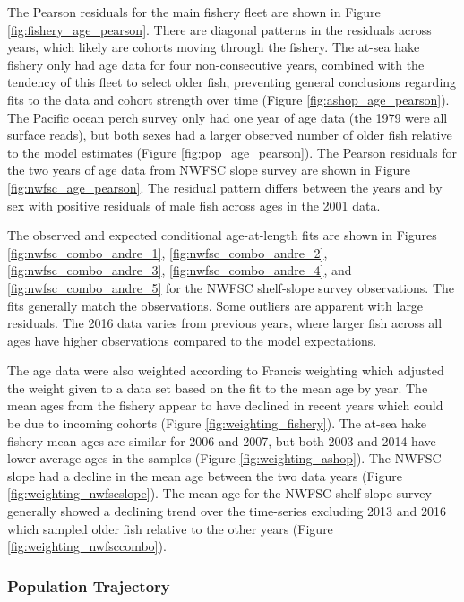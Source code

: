 \documentclass[12pt,]{article}
\begin{document}
The Pearson residuals for the main fishery fleet are shown in Figure
\ref{fig:fishery_age_pearson}. There are diagonal patterns in the
residuals across years, which likely are cohorts moving through the
fishery. The at-sea hake fishery only had age data for four
non-consecutive years, combined with the tendency of this fleet to
select older fish, preventing general conclusions regarding fits to the
data and cohort strength over time (Figure \ref{fig:ashop_age_pearson}).
The Pacific ocean perch survey only had one year of age data (the 1979
were all surface reads), but both sexes had a larger observed number of
older fish relative to the model estimates (Figure
\ref{fig:pop_age_pearson}). The Pearson residuals for the two years of
age data from NWFSC slope survey are shown in Figure
\ref{fig:nwfsc_age_pearson}. The residual pattern differs between the
years and by sex with positive residuals of male fish across ages in the
2001 data.

The observed and expected conditional age-at-length fits are shown in
Figures \ref{fig:nwfsc_combo_andre_1}, \ref{fig:nwfsc_combo_andre_2},
\ref{fig:nwfsc_combo_andre_3}, \ref{fig:nwfsc_combo_andre_4}, and
\ref{fig:nwfsc_combo_andre_5} for the NWFSC shelf-slope survey
observations. The fits generally match the observations. Some outliers
are apparent with large residuals. The 2016 data varies from previous
years, where larger fish across all ages have higher observations
compared to the model expectations.

The age data were also weighted according to Francis weighting which
adjusted the weight given to a data set based on the fit to the mean age
by year. The mean ages from the fishery appear to have declined in
recent years which could be due to incoming cohorts (Figure
\ref{fig:weighting_fishery}). The at-sea hake fishery mean ages are
similar for 2006 and 2007, but both 2003 and 2014 have lower average
ages in the samples (Figure \ref{fig:weighting_ashop}). The NWFSC slope
had a decline in the mean age between the two data years (Figure
\ref{fig:weighting_nwfscslope}). The mean age for the NWFSC shelf-slope
survey generally showed a declining trend over the time-series excluding
2013 and 2016 which sampled older fish relative to the other years
(Figure \ref{fig:weighting_nwfsccombo}).

\subsubsection{Population Trajectory}\label{population-trajectory}
\end{document}
